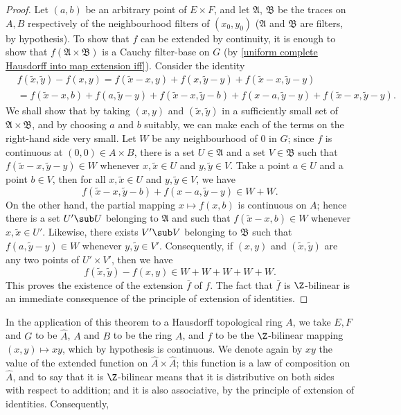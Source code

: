 \begin{proof}
Let $(a,b)$ be an arbitrary point of $E\times F$, and let $\mathfrak{A}$, $\mathfrak{B}$ be the traces on $A,B$ respectively of the neighbourhood filters of $(x_0,y_0)$ ($\mathfrak{A}$ and $\mathfrak{B}$ are filters, by hypothesis). To show that $f$ can be extended by continuity, it is enough to show that $f(\mathfrak{A}\times\mathfrak{B})$ is a Cauchy filter-base on $G$ (by \cref{uniform complete Hausdorff into map extension iff}). Consider the identity
\begin{align*}
&f(\tilde{x},\tilde{y})-f(x,y)=f(\tilde{x}-x,y)+f(x,\tilde{y}-y)+f(\tilde{x}-x,\tilde{y}-y)\\
&=f(\tilde{x}-x,b)+f(a,\tilde{y}-y)+f(\tilde{x}-x,\tilde{y}-b)+f(x-a,\tilde{y}-y)+f(\tilde{x}-x,\tilde{y}-y).
\end{align*}
We shall show that by taking $(x,y)$ and $(\tilde{x},\tilde{y})$ in a sufficiently small set of $\mathfrak{A}\times\mathfrak{B}$, and by choosing $a$ and $b$ suitably, we can make each of the terms on the right-hand side very small. Let $W$ be any neighbourhood of $0$ in $G$; since $f$ is continuous at $(0,0)\in A\times B$, there is a set $U\in\mathfrak{A}$ and a set $V\in\mathfrak{B}$ such that $f(\tilde{x}-x,\tilde{y}-y)\in W$ whenever $x,\tilde{x}\in U$ and $y,\tilde{y}\in V$. Take a point $a\in U$ and a point $b\in V$, then for all $x,\tilde{x}\in U$ and $y,\tilde{y}\in V$, we have
\[f(\tilde{x}-x,\tilde{y}-b)+f(x-a,\tilde{y}-y)\in W+W.\]
On the other hand, the partial mapping $x\mapsto f(x,b)$ is continuous on $A$; hence there is a set $U'\sub U$ belonging to $\mathfrak{A}$ and such that $f(\tilde{x}-x,b)\in W$ whenever $x,\tilde{x}\in U'$. Likewise, there exists $V'\sub V$ belonging to $\mathfrak{B}$ such that $f(a,\tilde{y}-y)\in W$ whenever $y,\tilde{y}\in V'$. Consequently, if $(x,y)$ and $(\tilde{x},\tilde{y})$ are any two points of $U'\times V'$, then we have
\[f(\tilde{x},\tilde{y})-f(x,y)\in W+W+W+W+W.\]
This proves the existence of the extension $\bar{f}$ of $f$. The fact that $\bar{f}$ is $\Z$-bilinear is an immediate consequence of the principle of extension of identities. 
\end{proof}
In the application of this theorem to a Hausdorff topological ring $A$, we take $E,F$ and $G$ to be $\widehat{A}$, $A$ and $B$ to be the ring $A$, and $f$ to be the $\Z$-bilinear mapping $(x,y)\mapsto xy$, which by hypothesis is continuous. We denote again by $xy$ the value of the extended function on $\widehat{A}\times\widehat{A}$; this function is a law of composition on $\widehat{A}$, and to say that it is $\Z$-bilinear means that it is distributive on both sides with respect to addition; and it is also associative, by the principle of extension of identities. Consequently,
